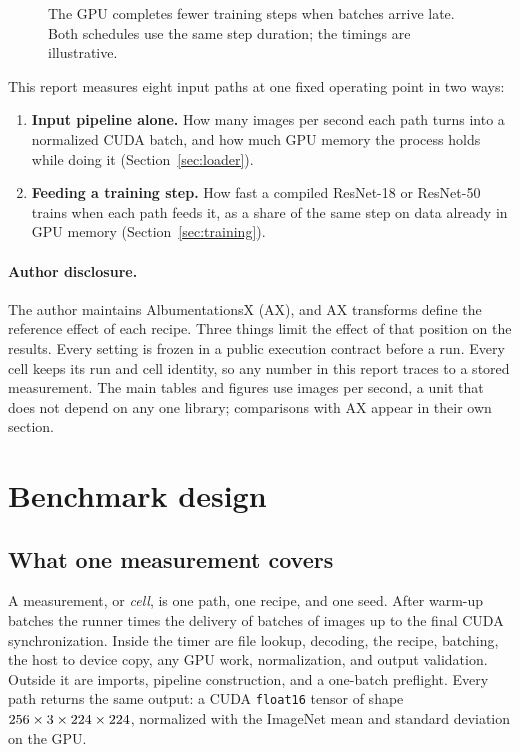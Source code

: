 \documentclass[11pt]{article}
\begin{document}
\begin{figure}[H]
\centering

\caption{The GPU completes fewer training steps when batches arrive late. Both schedules use
the same step duration; the timings are illustrative.}
\label{fig:batch-wait}
\end{figure}

This report measures eight input paths at one fixed operating point in two ways:

\begin{enumerate}
\item \textbf{Input pipeline alone.} How many images per second each path turns into a
normalized CUDA batch, and how much GPU memory the process holds while doing it
(Section~\ref{sec:loader}).
\item \textbf{Feeding a training step.} How fast a compiled ResNet-18 or ResNet-50 trains when
each path feeds it, as a share of the same step on data already in GPU memory
(Section~\ref{sec:training}).
\end{enumerate}

\paragraph{Author disclosure.} The author maintains AlbumentationsX (AX), and AX transforms define
the reference effect of each recipe. Three things limit the effect of that position on the
results. Every setting is frozen in a public execution contract before a run. Every cell keeps
its run and cell identity, so any number in this report traces to a stored measurement. The
main tables and figures use images per second, a unit that does not depend on any one library;
comparisons with AX appear in their own section.

\section{Benchmark design}
\label{sec:design}

\subsection{What one measurement covers}

A measurement, or \emph{cell}, is one path, one recipe, and one seed. After \WarmupBatches{} warm-up batches the
runner times the delivery of \MeasuredBatches{} batches of \BatchSize{} images up to the final CUDA
synchronization. Inside the timer are file lookup, decoding, the recipe, batching, the host to
device copy, any GPU work, normalization, and output validation. Outside it are imports,
pipeline construction, and a one-batch preflight. Every path returns the same output: a CUDA
\texttt{float16} tensor of shape \(256\times3\times224\times224\), normalized with the
ImageNet mean and standard deviation on the GPU.
\end{document}
